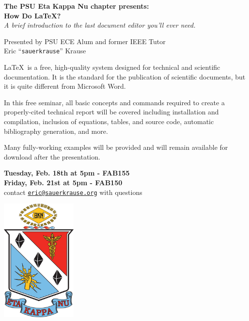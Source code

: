 \documentclass{article}
\begin{document}
    \begin{center} \LARGE 
        \textbf{The PSU Eta Kappa Nu chapter presents:}\\\vspace*{.25in}
        {\Huge \bf How Do \LaTeX?}\\
                        \Large \textit{A brief introduction to the last document editor you'll ever need.}\vspace{.25in}

        Presented by PSU ECE Alum and former IEEE Tutor\\
        Eric ``\texttt{sauerkrause}'' Krause\\     
    \end{center}\vspace{.15in}

    \Large\LaTeX\ is a  free, high-quality system designed for technical and scientific documentation. It is the standard for the publication of scientific documents, but it is quite different from Microsoft Word.\vspace{.2in}

    In this free seminar, all basic concepts and commands required to create a properly-cited technical report will be covered including installation and compilation, inclusion of equations, tables, and source code, automatic bibliography generation, and more.\vspace{.2in}

    Many fully-working examples will be provided and will remain available for download after the presentation. 
  
    \begin{center} \Huge
        \textbf{Tuesday, Feb. 18th at 5pm - FAB155\\}
        \textbf{Friday, Feb. 21st at 5pm - FAB150\\}
        \vspace{.2in}
        \Large contact \texttt{\href{mailto:eric@sauerkrause.org}{eric@sauerkrause.org}} with questions\\        \vspace*{.15in}

        \includegraphics[width=1.5in]{Resources/hkn.png}
    \end{center}
\end{document}
